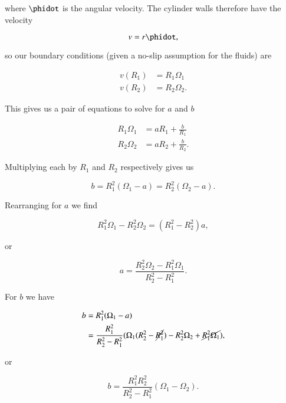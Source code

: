 where $\phidot$ is the angular velocity.  The cylinder walls therefore have the velocity

\begin{equation}\label{eqn:couetteFlow:230}
v = r \phidot,
\end{equation}

so our boundary conditions (given a no-slip assumption for the fluids) are

\begin{align}\label{eqn:couetteFlow:250}
v(R_1) &= R_1 \Omega_1 \\
v(R_2) &= R_2 \Omega_2.
\end{align}

This gives us a pair of equations to solve for $a$ and $b$

\begin{align}\label{eqn:couetteFlow:270}
R_1 \Omega_1 &= a R_1 + \frac{b}{R_1} \\
R_2 \Omega_2 &= a R_2 + \frac{b}{R_2}.
\end{align}

Multiplying each by $R_1$ and $R_2$ respectively gives us

\begin{equation}\label{eqn:couetteFlow:290}
b = R_1^2 (\Omega_1 - a) = R_2^2 (\Omega_2 - a).
\end{equation}

Rearranging for $a$ we find

\begin{equation}\label{eqn:couetteFlow:310}
R_1^2 \Omega_1 - R_2^2 \Omega_2 = (R_1^2 - R_2^2) a,
\end{equation}

or

\begin{equation}\label{eqn:couetteFlow:330}
a = \frac{ R_2^2 \Omega_2 - R_1^2 \Omega_1}{R_2^2 - R_1^2}.
\end{equation}

For $b$ we have

\begin{align*}
b &= 
R_1^2 (\Omega_1 - a) \\
&=
\frac{R_1^2 }{R_2^2 - R_1^2}
(\Omega_1 ( R_2^2 - \cancel{R_1^2}) - 
R_2^2 \Omega_2 + \cancel{R_1^2 \Omega_1}
),
\end{align*}

or

\begin{equation}\label{eqn:couetteFlow:350}
b = \frac{R_1^2 R_2^2}{R_2^2 - R_1^2} (\Omega_1 -\Omega_2).
\end{equation}

